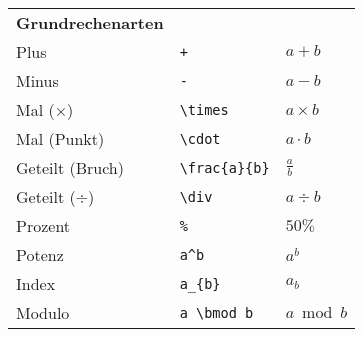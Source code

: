 \begin{table}[H]
\begin{longtable}{>{\raggedright}p{4cm} >{\raggedright}p{6cm} >{\raggedright}p{5cm}}
        \textbf{Grundrechenarten}                            &                                                                                         &                                      \\
        Plus                                                 & \texttt{+}                                                                              & $ a + b $                            \\
        Minus                                                & \texttt{-}                                                                              & $ a - b $                            \\
        Mal (×)                                              & \texttt{\textbackslash times}                                                           & $ a \times b $                       \\
        Mal (Punkt)                                          & \texttt{\textbackslash cdot}                                                            & $ a \cdot b $                        \\
        Geteilt (Bruch)                                      & \texttt{\textbackslash frac\{a\}\{b\}}                                                  & $ \frac{a}{b} $                      \\
        Geteilt (÷)                                          & \texttt{\textbackslash div}                                                             & $ a \div b $                         \\
        Prozent                                              & \texttt{\%}                                                                             & $ 50\% $                             \\
        Potenz                                               & \texttt{a\^{}b}                                                                         & $ a^b $                              \\
        Index                                                & \texttt{a\_\{b\}}                                                                       & $ a_b $                              \\
        Modulo                                               & \texttt{a \textbackslash bmod b}                                                        & $ a \bmod b $                        \\


\end{longtable}
\end{table}
